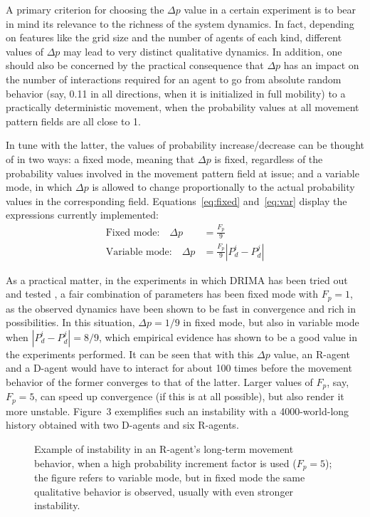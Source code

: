 \documentclass[11pt, a4paper]{article}
\begin{document}
A primary criterion for choosing the $\Delta p$ value in a certain experiment is to bear in mind its relevance to the richness of the system dynamics. In fact, depending on features like the grid size and the number of agents of each kind, different values of $\Delta p$ may lead to very distinct qualitative dynamics. In addition, one should also be concerned by the practical consequence that $\Delta p$ has an impact on the number of interactions required for an agent to go from absolute random behavior (say, 0.11 in all directions, when it is initialized in full mobility) to a practically deterministic movement, when the probability values at all movement pattern fields are all close to 1.

In tune with the latter, the values of probability increase/decrease can be thought of in two ways: a fixed mode, meaning that $\Delta p$ is fixed, regardless of the probability values involved in the movement pattern field at issue; and a variable mode, in which $\Delta p$ is allowed to change proportionally to the actual probability values in the corresponding field. Equations~\eqref{eq:fixed} and~\eqref{eq:var} display the expressions currently implemented:
\begin{align}
\text{Fixed mode:}\quad \Delta p &= \frac{F_p}{9} \label{eq:fixed} \\[0.5em]
\text{Variable mode:}\quad \Delta p &= \frac{F_p}{9} \left| P_d^i - P_d^j \right| \label{eq:var}
\end{align}

As a practical matter, in the experiments in which DRIMA has been tried out and tested \cite{ref6}, a fair combination of parameters has been fixed mode with $F_{p}=1$, as the observed dynamics have been shown to be fast in convergence and rich in possibilities. In this situation, $\Delta p=1/9$ in fixed mode, but also in variable mode when $|P_{d}^{i}-P_{d}^{j}|=8/9$, which empirical evidence has shown to be a good value in the experiments performed. It can be seen that with this $\Delta p$ value, an R-agent and a D-agent would have to interact for about 100 times before the movement behavior of the former converges to that of the latter. Larger values of $F_{p}$, say, $F_{p}=5$, can speed up convergence (if this is at all possible), but also render it more unstable. Figure~3 exemplifies such an instability with a 4000-world-long history obtained with two D-agents and six R-agents.

\begin{figure}[htbp]
\centering
{}
\caption{Example of instability in an R-agent's long-term movement behavior, when a high probability increment factor is used ($F_{p}=5$); the figure refers to variable mode, but in fixed mode the same qualitative behavior is observed, usually with even stronger instability.}
\end{figure}
\end{document}
